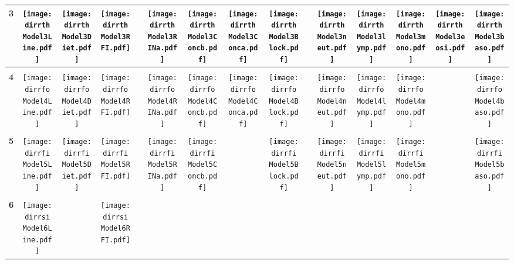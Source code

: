 \documentclass[landscape]{article}
\def \dirrth {U:/R/RA/Data/RFI-newdata/resultpairedcbc/pvalue05/Model3.Line.Diet.RFI.Concb.Conca.RINa.neut.lymp.mono.eosi.baso.Block/}
\def \dirrfo {U:/R/RA/Data/RFI-newdata/resultpairedcbc/pvalue05/Model4.Line.Diet.RFI.Concb.Conca.RINa.neut.lymp.mono.baso.Block/}
\def \dirrfi {U:/R/RA/Data/RFI-newdata/resultpairedcbc/pvalue05/Model5.Line.Diet.RFI.Concb.RINa.neut.lymp.mono.baso.Block/}
\def \dirrsi{U:/R/RA/Data/RFI-newdata/resultpairedcbc/pvalue05/Model6.Line.RFI.Concb.RINa.neut.lymp.mono.baso.Block/}
\begin{document}
\begin{table}
\begin{tabular}{ccccccccccccccc}
      {\Huge \textbf{3}} 
      &\texttt{[image: \\dirrth Model3Line.pdf]}
      &\texttt{[image: \\dirrth Model3Diet.pdf]}
      &\texttt{[image: \\dirrth Model3RFI.pdf]}
      &
      &\texttt{[image: \\dirrth Model3RINa.pdf]}
      &\texttt{[image: \\dirrth Model3Concb.pdf]}
      &\texttt{[image: \\dirrth Model3Conca.pdf]}
      &\texttt{[image: \\dirrth Model3Block.pdf]}
      &
      &\texttt{[image: \\dirrth Model3neut.pdf]}
      &\texttt{[image: \\dirrth Model3lymp.pdf]}
      &\texttt{[image: \\dirrth Model3mono.pdf]}
      &\texttt{[image: \\dirrth Model3eosi.pdf]}
      &\texttt{[image: \\dirrth Model3baso.pdf]}
     \\[3.5pt]
     \hline
     \\[3.5pt]
     {\Huge \textbf{4}} 
      &\texttt{[image: \\dirrfo Model4Line.pdf]}
      &\texttt{[image: \\dirrfo Model4Diet.pdf]}
      &\texttt{[image: \\dirrfo Model4RFI.pdf]}
      &
      &\texttt{[image: \\dirrfo Model4RINa.pdf]}
      &\texttt{[image: \\dirrfo Model4Concb.pdf]}
      &\texttt{[image: \\dirrfo Model4Conca.pdf]}
      &\texttt{[image: \\dirrfo Model4Block.pdf]}
      &
      &\texttt{[image: \\dirrfo Model4neut.pdf]}
      &\texttt{[image: \\dirrfo Model4lymp.pdf]}
      &\texttt{[image: \\dirrfo Model4mono.pdf]}
      &
      &\texttt{[image: \\dirrfo Model4baso.pdf]}
     \\[3.5pt]
     \hline
     \\[3.5pt]
     {\Huge \textbf{5}} 
      &\texttt{[image: \\dirrfi Model5Line.pdf]}
      &\texttt{[image: \\dirrfi Model5Diet.pdf]}
      &\texttt{[image: \\dirrfi Model5RFI.pdf]}
      &
      &\texttt{[image: \\dirrfi Model5RINa.pdf]}
      &\texttt{[image: \\dirrfi Model5Concb.pdf]}
      &
      &\texttt{[image: \\dirrfi Model5Block.pdf]}
      &
      &\texttt{[image: \\dirrfi Model5neut.pdf]}
      &\texttt{[image: \\dirrfi Model5lymp.pdf]}
      &\texttt{[image: \\dirrfi Model5mono.pdf]}
      &
      &\texttt{[image: \\dirrfi Model5baso.pdf]}
     \\[3.5pt]
     \hline
     \\[3.5pt]
     {\Huge \textbf{6}} 
      &\texttt{[image: \\dirrsi Model6Line.pdf]}
      &
      &\texttt{[image: \\dirrsi Model6RFI.pdf]}

\end{tabular}
\end{table}
\end{document}
